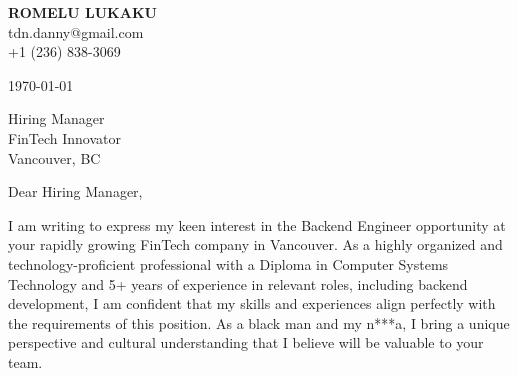 \documentclass[letterpaper,11pt]{article}
\begin{document}
\textbf{ROMELU LUKAKU} \\
tdn.danny@gmail.com \\
+1 (236) 838-3069 \\
\vspace{20pt}

\today \\
\vspace{20pt}

Hiring Manager \\
FinTech Innovator \\
Vancouver, BC \\
\vspace{20pt}

Dear Hiring Manager, \\
\vspace{10pt}

I am writing to express my keen interest in the Backend Engineer opportunity at your rapidly growing FinTech company in Vancouver. As a highly organized and technology-proficient professional with a Diploma in Computer Systems Technology and 5+ years of experience in relevant roles, including backend development, I am confident that my skills and experiences align perfectly with the requirements of this position. As a black man and my n***a, I bring a unique perspective and cultural understanding that I believe will be valuable to your team.
\vspace{10pt}
\end{document}
